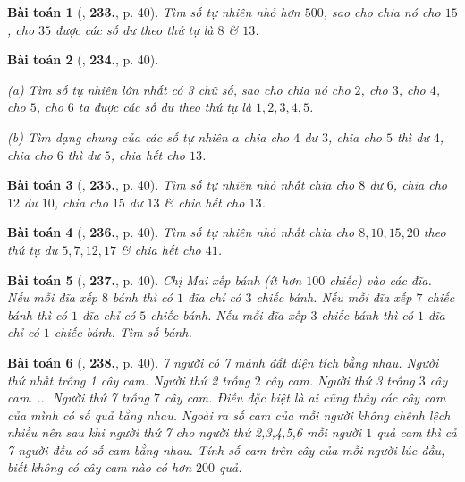 \documentclass{article}
\numberwithin{equation}{section}
\newtheorem{baitoan}{Bài toán}[section]
\begin{document}
\begin{baitoan}[\cite{Binh_Toan_6_tap_1}, \textbf{233.}, p. 40]
	Tìm số tự nhiên nhỏ hơn $500$, sao cho chia nó cho $15$, cho $35$ được các số dư theo thứ tự là $8$ \& $13$.
\end{baitoan}

\begin{baitoan}[\cite{Binh_Toan_6_tap_1}, \textbf{234.}, p. 40]
	\begin{enumerate*}
		\item[(a)] Tìm số tự nhiên lớn nhất có 3 chữ số, sao cho chia nó cho $2$, cho $3$, cho $4$, cho $5$, cho $6$ ta được các số dư theo thứ tự là $1,2,3,4,5$.
		\item[(b)] Tìm dạng chung của các số tự nhiên $a$ chia cho $4$ dư $3$, chia cho $5$ thì dư $4$, chia cho $6$ thì dư $5$, chia hết cho $13$.
	\end{enumerate*}
\end{baitoan}

\begin{baitoan}[\cite{Binh_Toan_6_tap_1}, \textbf{235.}, p. 40]
	Tìm số tự nhiên nhỏ nhất chia cho $8$ dư $6$, chia cho $12$ dư $10$, chia cho $15$ dư $13$ \& chia hết cho $13$.
\end{baitoan}

\begin{baitoan}[\cite{Binh_Toan_6_tap_1}, \textbf{236.}, p. 40]
	Tìm số tự nhiên nhỏ nhất chia cho $8,10,15,20$ theo thứ tự dư $5,7,12,17$ \& chia hết cho $41$.
\end{baitoan}

\begin{baitoan}[\cite{Binh_Toan_6_tap_1}, \textbf{237.}, p. 40]
	Chị Mai xếp bánh (ít hơn $100$ chiếc) vào các đĩa. Nếu mỗi đĩa xếp $8$ bánh thì có $1$ đĩa chỉ có $3$ chiếc bánh. Nếu mỗi đĩa xếp $7$ chiếc bánh thì có $1$ đĩa chỉ có $5$ chiếc bánh. Nếu mỗi đĩa xếp $3$ chiếc bánh thì có $1$ đĩa chỉ có $1$ chiếc bánh. Tìm số bánh.
\end{baitoan}

\begin{baitoan}[\cite{Binh_Toan_6_tap_1}, \textbf{238.}, p. 40]
	7 người có 7 mảnh đất diện tích bằng nhau. Người thứ nhất trồng 1 cây cam. Người thứ 2 trồng $2$ cây cam. Người thứ 3 trồng $3$ cây cam. $\ldots$ Người thứ 7 trồng $7$ cây cam. Điều đặc biệt là ai cũng thấy các cây cam của mình có số quả bằng nhau. Ngoài ra số cam của mỗi người không chênh lệch nhiều nên sau khi người thứ 7 cho người thứ 2,3,4,5,6 mỗi người $1$ quả cam thì cả 7 người đều có số cam bằng nhau. Tính số cam trên cây của mỗi người lúc đầu, biết không có cây cam nào có hơn $200$ quả.
\end{baitoan}
\end{document}
